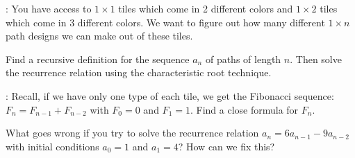 \documentclass[11pt]{exam}
\begin{document}

\begin{questions}
: You have access to $1 \times 1$ tiles which come in 2 different colors and $1\times 2$ tiles which come in 3 different colors.  We want to figure out how many different $1 \times n$ path designs we can make out of these tiles.

Find a recursive definition for the sequence $a_n$ of paths of length $n$.  Then solve the recurrence relation using the characteristic root technique.

\vfill
\vfill
{}: Recall, if we have only one type of each tile, we get the Fibonacci sequence: $F_n = F_{n-1} + F_{n-2}$ with $F_0 = 0$ and $F_1 = 1$.  Find a close formula for $F_n$.

\vfill
\vfill
\question What goes wrong if you try to solve the recurrence relation $a_n = 6a_{n-1} - 9a_{n-2}$ with initial conditions $a_0 = 1$ and $a_1 = 4$?  How can we fix this?
\vfill
\end{questions}
\end{document}
